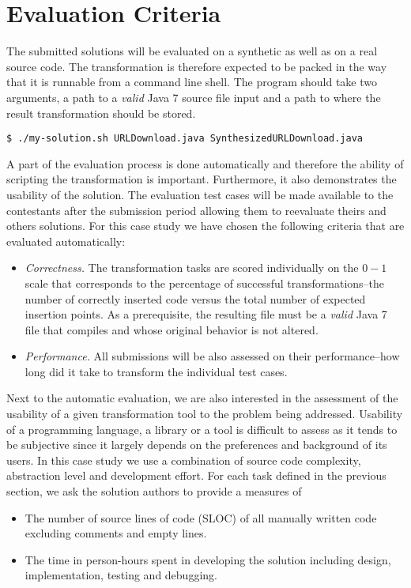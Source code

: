 
\section{Evaluation Criteria}
\label{sec:EvaluationCriteria}

The submitted solutions will be evaluated on a synthetic as well as on a real source code.
The transformation is therefore expected to be packed in the way that it is runnable from a command line shell.
The program should take two arguments, a path to a \emph{valid} Java 7 source file input and a path to where the result transformation should be stored.
%
\begin{verbatim}
$ ./my-solution.sh URLDownload.java SynthesizedURLDownload.java
\end{verbatim}

A part of the evaluation process is done automatically and therefore the ability of scripting the transformation is important.
Furthermore, it also demonstrates the usability of the solution.
The evaluation test cases will be made available to the contestants after the submission period allowing them to reevaluate theirs and others solutions.
For this case study we have chosen the following criteria that are evaluated automatically:
%
\begin{itemize}[--]
  \item \emph{Correctness.} The transformation tasks are scored individually on the $0-1$ scale that corresponds to the percentage of successful transformations--\Ie the number of correctly inserted code versus the total number of expected insertion points.
  As a prerequisite, the resulting file must be a \emph{valid} Java 7 file that compiles and whose original behavior is not altered.
  
  \item \emph{Performance.} All submissions will be also assessed on their performance--\Ie how long did it take to transform the individual test cases.
\end{itemize}

Next to the automatic evaluation, we are also interested in the assessment of the usability of a given transformation tool to the problem being addressed.
Usability of a programming language, a library or a tool is difficult to assess as it tends to be subjective since it largely depends on the preferences and background of its users.
In this case study we use a combination of source code complexity, abstraction level and development effort.
For each task defined in the previous section, we ask the solution authors to provide a measures of 
%
\begin{itemize}[--]
  \item The number of source lines of code (SLOC) of all manually written code excluding comments and empty lines.
  \item The time in person-hours spent in developing the solution including design, implementation, testing and debugging.
\end{itemize}


